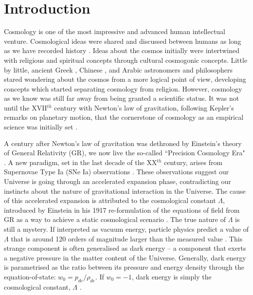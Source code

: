 %
\chapter{Introduction}
\label{sec:intro}


Cosmology is one of the most impressive and advanced human intellectual venture. Cosmological ideas were shared and discussed between humans as long as we have recorded history \citep{preBabylonianCosmology,BabylonianCosmology1}. Ideas about the cosmos initially were intertwined with religious and spiritual concepts through cultural cosmogonic %
concepts. Little by little, ancient Greek \citep{GreekCosmology}, Chinese \citep{ChineseCosmology}, and Arabic \citep{ArabicCosmology} astronomers and philosophers stared wondering about the cosmos from a more logical point of view, developing concepts which started separating cosmology from religion. However, cosmology as we know was still far away from being granted a scientific status. It was not until the XVII$^{th}$ century with Newton's law of gravitation, following Kepler's remarks on planetary motion, that the cornerstone of cosmology as an empirical science was initially set \citep{Gleiser}.

\qquad A century after Newton's law of gravitation was dethroned by Einstein's theory of General Relativity (GR), we now live the so-called ``Precision Cosmology Era" \citep{2005PrecisionCosmology}. A new paradigm, set in the last decade of the XX$^{th}$ century, arises from Supernovae Type Ia (SNe Ia) observations \citep{1998Riess,1999Perlmutter}. These observations suggest our Universe is going through an accelerated expansion phase, contradicting our instincts about the nature of gravitational interaction in the Universe. The cause of this accelerated expansion is attributed to the cosmological constant $\Lambda$, introduced by Einstein in his 1917 re-formulation of the equations of field from GR as a way to achieve a static cosmological scenario \citep{1917Einstein}. The true nature of $\Lambda$ is still a mystery. If interpreted as vacuum energy, particle physics predict a value of $\Lambda$ that is around 120 orders of magnitude larger than the measured value \citep{2018LambdaCentury}. This strange component is often generalised as dark energy -- a component that exerts a negative pressure in the matter content of the Universe. Generally, dark energy is parametrised as the ratio between its pressure and energy density through the equation-of-state: $w_0 = p_{de}/\rho_{de}$. If $w_0 = -1$, dark energy is simply the cosmological constant, $\Lambda$ .


